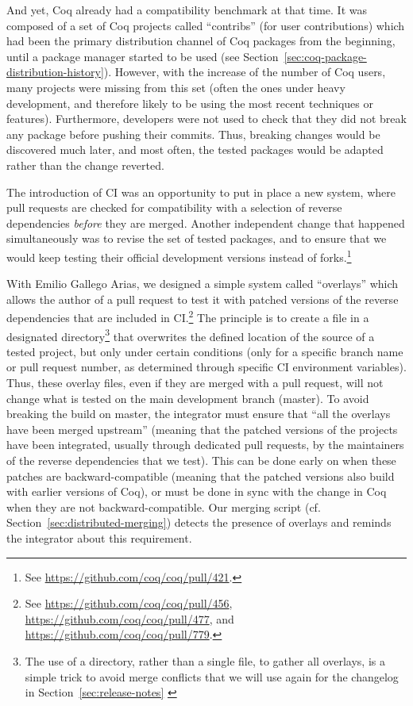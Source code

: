 And yet, Coq already had a compatibility benchmark at that time.
It was composed of a set of Coq projects called ``contribs'' (for user contributions) which had been the primary distribution channel of Coq packages from the beginning, until a package manager started to be used (see Section~\ref{sec:coq-package-distribution-history}).
However, with the increase of the number of Coq users, many projects were missing from this set (often the ones under heavy development, and therefore likely to be using the most recent techniques or features).
Furthermore, developers were not used to check that they did not break any package before pushing their commits.
Thus, breaking changes would be discovered much later, and most often, the tested packages would be adapted rather than the change reverted.

The introduction of CI was an opportunity to put in place a new system, where pull requests are checked for compatibility with a selection of reverse dependencies \emph{before} they are merged. Another independent change that happened simultaneously was to revise the set of tested packages, and to ensure that we would keep testing their official development versions instead of forks.\footnote{
	See \url{https://github.com/coq/coq/pull/421}.
}

With Emilio Gallego Arias, we designed a simple system called ``overlays'' which allows the author of a pull request to test it with patched versions of the reverse dependencies that are included in CI.\footnote{
	See \url{https://github.com/coq/coq/pull/456}, \url{https://github.com/coq/coq/pull/477}, and \url{https://github.com/coq/coq/pull/779}.
}
The principle is to create a file in a designated directory\footnote{
	The use of a directory, rather than a single file, to gather all overlays, is a simple trick to avoid merge conflicts that we will use again for the changelog in Section~\ref{sec:release-notes}
	\label{footnote:directory}
}
that overwrites the defined location of the source of a tested project, but only under certain conditions (only for a specific branch name or pull request number, as determined through specific CI environment variables).
Thus, these overlay files, even if they are merged with a pull request, will not change what is tested on the main development branch (master).
To avoid breaking the build on master, the integrator must ensure that ``all the overlays have been merged upstream'' (meaning that the patched versions of the projects have been integrated, usually through dedicated pull requests, by the maintainers of the reverse dependencies that we test).
This can be done early on when these patches are backward-compatible (meaning that the patched versions also build with earlier versions of Coq), or must be done in sync with the change in Coq when they are not backward-compatible.
Our merging script (cf. Section~\ref{sec:distributed-merging}) detects the presence of overlays and reminds the integrator about this requirement.

